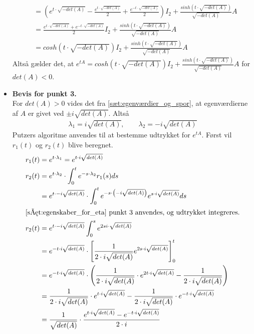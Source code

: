 \begin{bev}
\begin{itemize}
\begin{align*}
        &= \left(e^{t \cdot \sqrt{-det(A)}} - \frac{e^{t\cdot\sqrt{-det(A)}}}{2} + \frac{e^{-t\cdot\sqrt{-det(A)}}}{2} \right) I_2 + \frac{sinh\left(t\cdot \sqrt{-det(A)}\right)}{\sqrt{-det(A)}}A\\
        &= \frac{e^{t \cdot \sqrt{-det(A)}}+e^{-t \cdot \sqrt{-det(A)}}}{2}I_2+ \frac{sinh\left(t\cdot \sqrt{-det(A)}\right)}{\sqrt{-det(A)}}A\\
        &= cosh\left(t\cdot \sqrt{-det(A)}\right) I_2 + \frac{sinh\left(t\cdot \sqrt{-det(A)}\right)}{\sqrt{-det(A)}} A
    \end{align*}
    Altså gælder det, at $e^{tA} = cosh\left(t\cdot \sqrt{-det(A)}\right) I_2 + \frac{sinh\left(t\cdot \sqrt{-det(A)}\right)}{\sqrt{-det(A)}}A$ for $det(A)<0$.
    \item [] \textbf{Bevis for punkt 3.}\\    
    For $det(A)>0$ vides det fra \autoref{sæt:egenværdier_og_spor}, at egenværdierne af $A$ er givet ved $\pm i\sqrt{det(A)}$. Altså
    \begin{align*}
        \lambda_1=i\sqrt{det(A)},\qquad \lambda_2=-i\sqrt{det(A)}
    \end{align*}   
    Putzers algoritme anvendes til at bestemme udtrykket for $e^{tA}$. Først vil $r_1(t)$ og $r_2(t)$ blive beregnet.
    \begin{align*}
        r_1(t) &= e^{t\cdot \lambda_1} = e^{t \cdot i\sqrt{det(A)}} \\
        r_2(t) &= e^{t\cdot \lambda_2} \cdot \int_0^te^{-s\cdot \lambda_2}r_1(s) ds\\
        &= e^{t\cdot -i\sqrt{det(A)}} \cdot \int_0^te^{-s\cdot \left(-i\sqrt{det(A)}\right)} e^{s \cdot i\sqrt{det(A)}} ds\\
        \intertext{\autoref{sæt:egenskaber_for_eta} punkt 3 anvendes, og udtrykket integreres.}
         r_2(t)&=e^{t\cdot -i\sqrt{det(A)}}\int_0^s e^{2si\cdot \sqrt{det(A)}}\\
         &=e^{-t\cdot i\sqrt{det(A)}}\cdot \left[\frac{1}{2\cdot i\sqrt{det(A)}}e^{2s\cdot i\sqrt{det(A)}}\right]^t_0\\
         &= e^{-t\cdot i\sqrt{det(A)}}\cdot \left(\frac{1}{2\cdot i\sqrt{det(A)}}\cdot e^{2t\cdot i\sqrt{det(A)}} - \frac{1}{2\cdot i\sqrt{det(A)}}\right)\\
         &= \frac{1}{2 \cdot i\sqrt{det(A)}}\cdot e^{t\cdot i\sqrt{det(A)}} - \frac{1}{2 \cdot i\sqrt{det(A)}}\cdot e^{-t\cdot i\sqrt{det(A)}}\\
         &=\frac{1}{\sqrt{det(A)}} \cdot \frac{e^{t\cdot i\sqrt{det(A)}}-e^{-t\cdot i\sqrt{det(A)}}}{2\cdot i}

\end{align*}
\end{itemize}
\end{bev}

